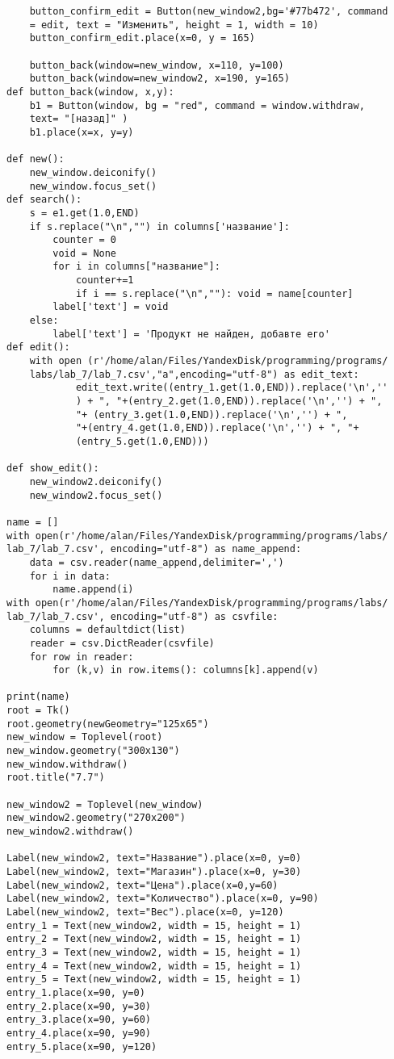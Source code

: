 \documentclass[a4paper]{article}
\begin{document}
\begin{lab1}
\begin{verbatim}
    button_confirm_edit = Button(new_window2,bg='#77b472', command
    = edit, text = "Изменить", height = 1, width = 10)
    button_confirm_edit.place(x=0, y = 165)

    button_back(window=new_window, x=110, y=100)
    button_back(window=new_window2, x=190, y=165)
def button_back(window, x,y):
    b1 = Button(window, bg = "red", command = window.withdraw, 
    text= "[назад]" )
    b1.place(x=x, y=y)

def new():
    new_window.deiconify()
    new_window.focus_set()
def search():
    s = e1.get(1.0,END)
    if s.replace("\n","") in columns['название']:
        counter = 0
        void = None
        for i in columns["название"]:
            counter+=1
            if i == s.replace("\n",""): void = name[counter]
        label['text'] = void
    else:
        label['text'] = 'Продукт не найден, добавте его'
def edit():
    with open (r'/home/alan/Files/YandexDisk/programming/programs/
    labs/lab_7/lab_7.csv',"a",encoding="utf-8") as edit_text:
            edit_text.write((entry_1.get(1.0,END)).replace('\n',''
            ) + ", "+(entry_2.get(1.0,END)).replace('\n','') + ", 
            "+ (entry_3.get(1.0,END)).replace('\n','') + ", 
            "+(entry_4.get(1.0,END)).replace('\n','') + ", "+ 
            (entry_5.get(1.0,END)))

def show_edit():
    new_window2.deiconify()
    new_window2.focus_set()

name = []
with open(r'/home/alan/Files/YandexDisk/programming/programs/labs/
lab_7/lab_7.csv', encoding="utf-8") as name_append:
    data = csv.reader(name_append,delimiter=',')
    for i in data:
        name.append(i)
with open(r'/home/alan/Files/YandexDisk/programming/programs/labs/
lab_7/lab_7.csv', encoding="utf-8") as csvfile:
    columns = defaultdict(list)
    reader = csv.DictReader(csvfile)
    for row in reader:
        for (k,v) in row.items(): columns[k].append(v)

print(name)
root = Tk()
root.geometry(newGeometry="125x65")
new_window = Toplevel(root)
new_window.geometry("300x130")
new_window.withdraw()
root.title("7.7")

new_window2 = Toplevel(new_window)
new_window2.geometry("270x200")
new_window2.withdraw()

Label(new_window2, text="Название").place(x=0, y=0)
Label(new_window2, text="Магазин").place(x=0, y=30)
Label(new_window2, text="Цена").place(x=0,y=60)
Label(new_window2, text="Количество").place(x=0, y=90)
Label(new_window2, text="Вес").place(x=0, y=120)
entry_1 = Text(new_window2, width = 15, height = 1)
entry_2 = Text(new_window2, width = 15, height = 1)
entry_3 = Text(new_window2, width = 15, height = 1)
entry_4 = Text(new_window2, width = 15, height = 1)
entry_5 = Text(new_window2, width = 15, height = 1)
entry_1.place(x=90, y=0)
entry_2.place(x=90, y=30)
entry_3.place(x=90, y=60)
entry_4.place(x=90, y=90)
entry_5.place(x=90, y=120)


\end{verbatim}
\end{lab1}
\end{document}
